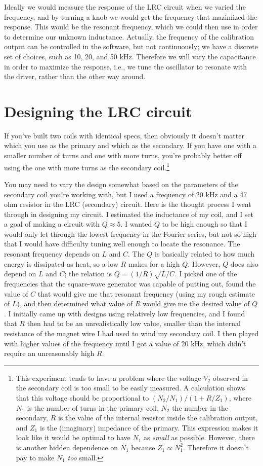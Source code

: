 Ideally we would measure the response of the LRC circuit when we
varied the frequency, and by turning a knob we would get the frequency
that mazimized the response. This would be the resonant frequency,
which we could then use in order to determine our unknown inductance.
Actually, the frequency of the calibration output can be controlled in
the software, but not continuously; we have a discrete set of choices,
such as 10, 20, and 50 kHz. Therefore we will vary the capacitance in
order to maximize the response, i.e., we tune the oscillator to resonate
with the driver, rather than the other way around.

\section*{Designing the LRC circuit}

If you've built two coils with identical specs, then obviously it doesn't
matter which you use as the primary and which as the secondary.
If you have one with a smaller number of turns and one with more turns,
you're probably better off using the one with more turns as the
secondary coil.\footnote{This experiment tends to have a problem where the
voltage $V_2$ observed in the secondary coil is too small to be easily measured.
A calculation shows that this voltage
should be proportional to $(N_2/N_1)/(1+R/Z_1)$, where $N_1$ is the number of turns
in the primary coil, $N_2$ the number in the secondary, $R$ is the value of the
internal resistor inside the calibration output, and $Z_1$ is the (imaginary) impedance of the primary.
This expression makes it look like it would be optimal to have $N_1$ as \emph{small} as possible.
However, there is another hidden dependence on $N_1$ because $Z_1\propto N_1^2$. Therefore it
doesn't pay to make $N_1$ \emph{too} small.}

You may need to vary the design somewhat based on the parameters of the secondary coil you're
working with, but I used  a frequency of 20 kHz
and a 47 ohm resistor in the LRC (secondary) circuit. Here is the thought
process I went through in designing my circuit. I estimated the inductance
of my coil, and I set a goal of making a circuit with $Q\approx 5$.
I wanted $Q$ to be high enough so that I
would only let through the lowest frequency in the Fourier series, but
not so high that I would have difficulty tuning well enough to locate the
resonance.  The resonant frequency depends on $L$ and $C$. The $Q$ is
basically related to how much energy is dissipated as heat, so a low
$R$ makes for a high $Q$. However, $Q$ does also depend on $L$ and $C$;
the relation is $Q=(1/R)\sqrt{L/C}$. I picked one of the frequencies that
the square-wave generator was capable of putting out, found the value of
$C$ that would give me that resonant frequency (using my rough estimate of $L$),
and then determined what value of $R$ would give me the desired value of
$Q$. I initially came up with designs using relatively low frequencies, and I found that $R$
then had to be an unrealistically low value, smaller than the internal
resistance of the magnet wire I had used to wind my secondary coil.
I then played with higher values of the frequency until I got a value of 20 kHz,
which didn't require an unreasonably high $R$.

